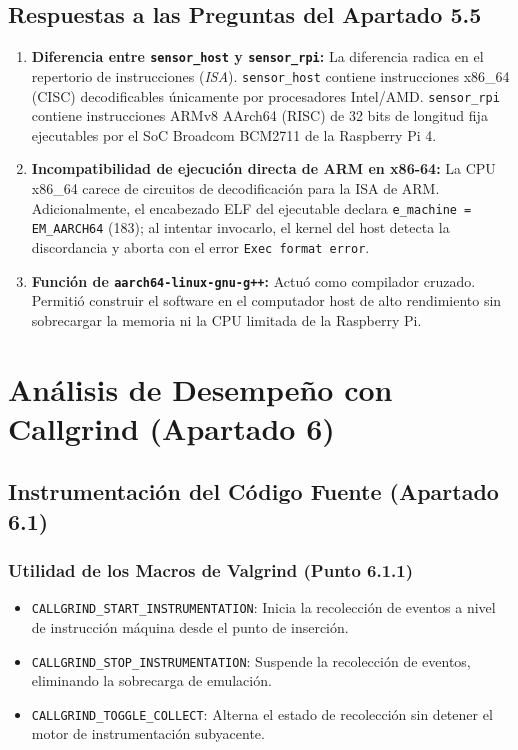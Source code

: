 \documentclass[11pt,a4paper]{article}
\begin{document}
\subsection{Respuestas a las Preguntas del Apartado 5.5}
\begin{enumerate}[label=\textbf{5.5.\arabic*.}]
    \item \textbf{Diferencia entre \texttt{sensor\_host} y \texttt{sensor\_rpi}:} 
    La diferencia radica en el repertorio de instrucciones (\textit{ISA}). \texttt{sensor\_host} contiene instrucciones x86\_64 (CISC) decodificables únicamente por procesadores Intel/AMD. \texttt{sensor\_rpi} contiene instrucciones ARMv8 AArch64 (RISC) de 32 bits de longitud fija ejecutables por el SoC Broadcom BCM2711 de la Raspberry Pi 4.
    
    \item \textbf{Incompatibilidad de ejecución directa de ARM en x86-64:}
    La CPU x86\_64 carece de circuitos de decodificación para la ISA de ARM. Adicionalmente, el encabezado ELF del ejecutable declara \texttt{e\_machine = EM\_AARCH64} (183); al intentar invocarlo, el kernel del host detecta la discordancia y aborta con el error \texttt{Exec format error}.
    
    \item \textbf{Función de \texttt{aarch64-linux-gnu-g++}:}
    Actuó como compilador cruzado. Permitió construir el software en el computador host de alto rendimiento sin sobrecargar la memoria ni la CPU limitada de la Raspberry Pi.
\end{enumerate}

\section{Análisis de Desempeño con Callgrind (Apartado 6)}

\subsection{Instrumentación del Código Fuente (Apartado 6.1)}

\subsubsection{Utilidad de los Macros de Valgrind (Punto 6.1.1)}
\begin{itemize}
    \item \texttt{CALLGRIND\_START\_INSTRUMENTATION}: Inicia la recolección de eventos a nivel de instrucción máquina desde el punto de inserción.
    \item \texttt{CALLGRIND\_STOP\_INSTRUMENTATION}: Suspende la recolección de eventos, eliminando la sobrecarga de emulación.
    \item \texttt{CALLGRIND\_TOGGLE\_COLLECT}: Alterna el estado de recolección sin detener el motor de instrumentación subyacente.
\end{itemize}
\end{document}
